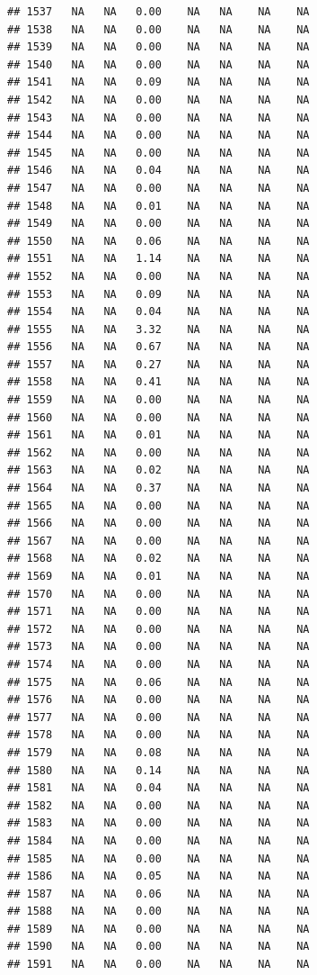 \documentclass{article}\usepackage{graphicx, color}
\makeatletter
\newenvironment{kframe}{%
 \def\at@end@of@kframe{}%
 \ifinner\ifhmode%
  \def\at@end@of@kframe{\end{minipage}}%
  \begin{minipage}{\columnwidth}%
 \fi\fi%
 \def\FrameCommand##1{\hskip\@totalleftmargin \hskip-\fboxsep
 \colorbox{shadecolor}{##1}\hskip-\fboxsep
     \hskip-\linewidth \hskip-\@totalleftmargin \hskip\columnwidth}%
 \MakeFramed {\advance\hsize-\width
   \@totalleftmargin\z@ \linewidth\hsize
   \@setminipage}}%
 {\par\unskip\endMakeFramed%
 \at@end@of@kframe}
\newenvironment{knitrout}{}{} %
\makeatother
\begin{document}
\begin{knitrout}
\begin{kframe}
\begin{verbatim}
## 1537   NA   NA   0.00    NA   NA    NA    NA
## 1538   NA   NA   0.00    NA   NA    NA    NA
## 1539   NA   NA   0.00    NA   NA    NA    NA
## 1540   NA   NA   0.00    NA   NA    NA    NA
## 1541   NA   NA   0.09    NA   NA    NA    NA
## 1542   NA   NA   0.00    NA   NA    NA    NA
## 1543   NA   NA   0.00    NA   NA    NA    NA
## 1544   NA   NA   0.00    NA   NA    NA    NA
## 1545   NA   NA   0.00    NA   NA    NA    NA
## 1546   NA   NA   0.04    NA   NA    NA    NA
## 1547   NA   NA   0.00    NA   NA    NA    NA
## 1548   NA   NA   0.01    NA   NA    NA    NA
## 1549   NA   NA   0.00    NA   NA    NA    NA
## 1550   NA   NA   0.06    NA   NA    NA    NA
## 1551   NA   NA   1.14    NA   NA    NA    NA
## 1552   NA   NA   0.00    NA   NA    NA    NA
## 1553   NA   NA   0.09    NA   NA    NA    NA
## 1554   NA   NA   0.04    NA   NA    NA    NA
## 1555   NA   NA   3.32    NA   NA    NA    NA
## 1556   NA   NA   0.67    NA   NA    NA    NA
## 1557   NA   NA   0.27    NA   NA    NA    NA
## 1558   NA   NA   0.41    NA   NA    NA    NA
## 1559   NA   NA   0.00    NA   NA    NA    NA
## 1560   NA   NA   0.00    NA   NA    NA    NA
## 1561   NA   NA   0.01    NA   NA    NA    NA
## 1562   NA   NA   0.00    NA   NA    NA    NA
## 1563   NA   NA   0.02    NA   NA    NA    NA
## 1564   NA   NA   0.37    NA   NA    NA    NA
## 1565   NA   NA   0.00    NA   NA    NA    NA
## 1566   NA   NA   0.00    NA   NA    NA    NA
## 1567   NA   NA   0.00    NA   NA    NA    NA
## 1568   NA   NA   0.02    NA   NA    NA    NA
## 1569   NA   NA   0.01    NA   NA    NA    NA
## 1570   NA   NA   0.00    NA   NA    NA    NA
## 1571   NA   NA   0.00    NA   NA    NA    NA
## 1572   NA   NA   0.00    NA   NA    NA    NA
## 1573   NA   NA   0.00    NA   NA    NA    NA
## 1574   NA   NA   0.00    NA   NA    NA    NA
## 1575   NA   NA   0.06    NA   NA    NA    NA
## 1576   NA   NA   0.00    NA   NA    NA    NA
## 1577   NA   NA   0.00    NA   NA    NA    NA
## 1578   NA   NA   0.00    NA   NA    NA    NA
## 1579   NA   NA   0.08    NA   NA    NA    NA
## 1580   NA   NA   0.14    NA   NA    NA    NA
## 1581   NA   NA   0.04    NA   NA    NA    NA
## 1582   NA   NA   0.00    NA   NA    NA    NA
## 1583   NA   NA   0.00    NA   NA    NA    NA
## 1584   NA   NA   0.00    NA   NA    NA    NA
## 1585   NA   NA   0.00    NA   NA    NA    NA
## 1586   NA   NA   0.05    NA   NA    NA    NA
## 1587   NA   NA   0.06    NA   NA    NA    NA
## 1588   NA   NA   0.00    NA   NA    NA    NA
## 1589   NA   NA   0.00    NA   NA    NA    NA
## 1590   NA   NA   0.00    NA   NA    NA    NA
## 1591   NA   NA   0.00    NA   NA    NA    NA

\end{verbatim}
\end{kframe}
\end{knitrout}
\end{document}
